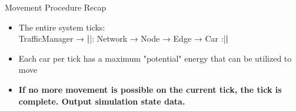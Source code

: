     \begin{frame}{Movement Procedure Recap}
        \begin{itemize}
            \item The entire system ticks:  \\
            TrafficManager → \textbf{|}|: Network → Node → Edge → Car :|\textbf{|}
            \item Each car per tick has a maximum "potential" energy that can be utilized to move
            \item \textbf{If no more movement is possible on the current tick, the tick is complete.  Output simulation state data.}
        \end{itemize}
    \end{frame} 